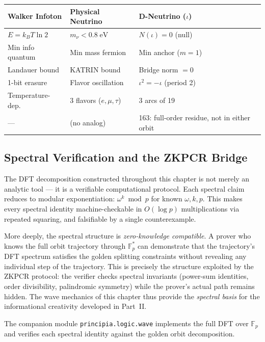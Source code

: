\begin{center}
\begin{tabular}{@{}lll@{}}
\toprule
\textbf{Walker Infoton} & \textbf{Physical Neutrino} & \textbf{D-Neutrino ($\iota$)} \\
\midrule
$E = k_B T \ln 2$ & $m_\nu < 0.8\;\mathrm{eV}$ & $N(\iota) = 0$ (null) \\
Min info quantum & Min mass fermion & Min anchor ($m = 1$) \\
Landauer bound & KATRIN bound & Bridge norm $= 0$ \\
1-bit erasure & Flavor oscillation & $\iota^2 = -\iota$ (period 2) \\
Temperature-dep. & 3 flavors ($e, \mu, \tau$) & 3 arcs of 19 \\
--- & (no analog) & 163: full-order residue, not in either orbit \\
\bottomrule
\end{tabular}
\end{center}



\subsection*{Spectral Verification and the ZKPCR Bridge}

The DFT decomposition constructed throughout this chapter is not merely an analytic tool --- it is a verifiable computational protocol. Each spectral claim reduces to modular exponentiation: $\omega^k \bmod p$ for known $\omega, k, p$. This makes every spectral identity machine-checkable in $O(\log p)$ multiplications via repeated squaring, and falsifiable by a single counterexample.

More deeply, the spectral structure is \emph{zero-knowledge compatible}. A prover who knows the full orbit trajectory through $\mathbb{F}_p^*$ can demonstrate that the trajectory's DFT spectrum satisfies the golden splitting constraints without revealing any individual step of the trajectory. This is precisely the structure exploited by the ZKPCR protocol: the verifier checks spectral invariants (power-sum identities, order divisibility, palindromic symmetry) while the prover's actual path remains hidden. The wave mechanics of this chapter thus provide the \emph{spectral basis} for the informational creativity developed in Part~II.

The companion module \texttt{principia.logic.wave} implements the full DFT over $\mathbb{F}_p$ and verifies each spectral identity against the golden orbit decomposition.


